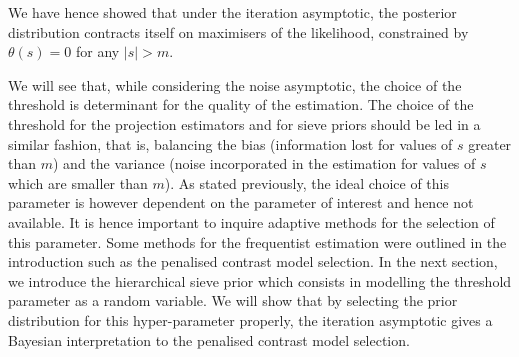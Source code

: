 We have hence showed that under the iteration asymptotic, the posterior distribution contracts itself on maximisers of the likelihood, constrained by $\theta(s) = 0$ for any $\vert s \vert > m$.

We will see that, while considering the noise asymptotic, the choice of the threshold is determinant for the quality of the estimation.
The choice of the threshold for the projection estimators and for sieve priors should be led in a similar fashion, that is, balancing the bias (information lost for values of $s$ greater than $m$) and the variance (noise incorporated in the estimation for values of $s$ which are smaller than $m$).
As stated previously, the ideal choice of this parameter is however dependent on the parameter of interest and hence not available.
It is hence important to inquire adaptive methods for the selection of this parameter.
Some methods for the frequentist estimation were outlined in the introduction such as the penalised contrast model selection.
In the next section, we introduce the hierarchical sieve prior which consists in modelling the threshold parameter as a random variable.
We will show that by selecting the prior distribution for this hyper-parameter properly, the iteration asymptotic gives a Bayesian interpretation to the penalised contrast model selection.
